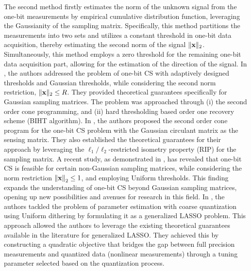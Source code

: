 \documentclass[12pt,draftcls,onecolumn]{IEEEtran}
\newcommand{\Fr}[1]{\textcolor{blue}{#1}}
\begin{document}
The second method %
firstly estimates the norm of the unknown signal from the one-bit measurements by empirical cumulative distribution function,
leveraging the Gaussianity of the sampling matrix. %
Specifically, this method partitions the measurements into two sets and utilizes a constant threshold in one-bit data acquisition,
thereby estimating the second norm of the signal $\|\mathbf{x}\|_2$. Simultaneously, this method employs a zero threshold for the remaining one-bit data acquisition part,
allowing for the estimation of the direction of the signal. In %
\cite{baraniuk2017exponential}, the authors addressed the problem of one-bit CS with adaptively designed thresholds and Gaussian thresholds, while considering the second norm restriction, $\|\mathbf{x}\|_2\leq R$. They provided theoretical guarantees specifically for Gaussian sampling matrices. The problem was approached through (i) the second order cone programming, and (ii) hard thresholding based order one recovery scheme (BIHT algorithm).
In \cite{dirksen2020one}, the authors proposed the second order cone program for the one-bit CS problem with the Gaussian circulant matrix
as the sensing matrix. They also established the theoretical guarantees for their approach by leveraging the $\ell_1/\ell_2$-restricted isometry property (RIP) for the sampling matrix.
A recent study, as demonstrated in \cite{dirksen2021non}, has revealed that one-bit CS is feasible for certain non-Gaussian sampling matrices, while considering the norm restriction $\left\|\mathbf{x}\right\|_2\leq 1$, and employing Uniform thresholds. This finding expands the understanding of one-bit CS beyond Gaussian sampling matrices, opening up new possibilities and avenues for research in this field. In \cite{thrampoulidis2020generalized}, the authors tackled the problem of parameter estimation with coarse quantization using Uniform dithering by formulating it as a generalized LASSO problem. This approach allowed the authors to leverage the existing theoretical guarantees available in the literature for generalized LASSO. They achieved this by constructing a quadratic objective that bridges the gap between full precision measurements and quantized data (nonlinear measurements) through a tuning parameter selected based on the quantization process.
\end{document}

